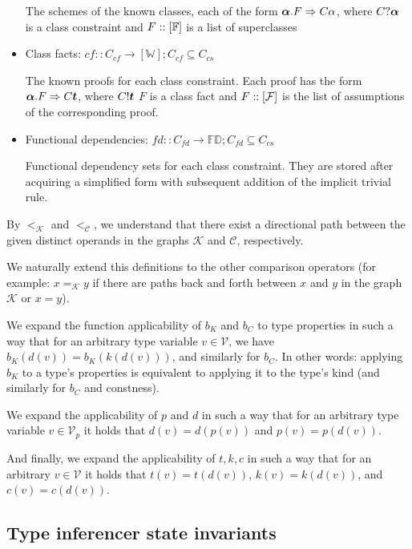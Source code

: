 \begin{itemize}
    The schemes of the known classes, each of the form $\boldsymbol{\alpha} . F \Rightarrow C \alpha$, where $C?  \boldsymbol{\alpha}$ is a class constraint and $F :: [\mathbb{F}]$ is a list of superclasses

    \item Class facts: $cf :: C_{cf} \to [\mathbb{W}]; C_{cf} \subseteq C_{cs}$

    The known proofs for each class constraint. Each proof has the form $\boldsymbol{\alpha} . F \Rightarrow C \boldsymbol{t}$, where $C! \boldsymbol{t}$ $F$ is a class fact and $F :: [\mathcal F]$ is the list of assumptions of the corresponding proof.

    \item Functional dependencies: $fd :: C_{fd} \to \mathbb{FD}; C_{fd} \subseteq C_{cs}$

    Functional dependency sets for each class constraint. They are stored after acquiring a simplified form with subsequent addition of the implicit trivial rule.
\end{itemize}

By $<_{\mathcal{K}}$ and $<_{\mathcal{C}}$,
we understand that there exist a directional path between the given distinct operands in the graphs $\mathcal{K}$ and $\mathcal{C}$, respectively.

We naturally extend this definitions to the other comparison operators
(for example: $x =_{\mathcal{K}} y$ if there are paths back and forth between $x$ and $y$ in the graph $\mathcal{K}$ or $x = y$).


\begin{defn}
    We expand the function applicability of $b_K$ and $b_C$ to type properties in such a way that for an arbitrary type variable $v \in \mathcal{V}$, we have $b_K (d (v)) = b_K (k (d (v)))$, and similarly for $b_C$. In other words: applying $b_K$ to a type's properties is equivalent to applying it to the type's kind (and similarly for $b_C$ and constness).

    We expand the applicability of $p$ and $d$ in such a way that for an arbitrary type variable $v \in \mathcal{V}_p$ it holds that $d(v) = d(p(v))$ and $p(v) = p(d(v))$.

    And finally, we expand the applicability of $t, k, c$ in such a way that for an arbitrary $v \in \mathcal{V}$ it holds that $t (v) = t (d (v))$, $k (v) = k (d (v))$, and $c (v) = c (d (v))$.
\end{defn}

\subsection{Type inferencer state invariants}

